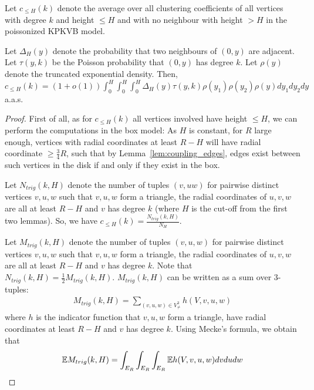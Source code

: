 \begin{lemma}
Let $c_{\leq H}(k)$ denote the average over all clustering coefficients of all vertices with degree $k$ and height $\leq H$ and with no neighbour with height $>H$ in the poissonized KPKVB model.

Let $\Delta_H(y)$ denote the probability that two neighbours of $(0,y)$ are adjacent. Let $\tau(y,k)$ be the Poisson probability that $(0,y)$ has degree $k$. Let $\rho(y)$ denote the truncated exponential density.
Then,
$c_{\leq H}(k) = (1+o(1))\int_0^H \int_0^H \int_0^H \Delta_H(y) \tau(y,k)\rho(y_1)\rho(y_2)\rho(y) dy_1dy_2 dy$ a.a.s.
\end{lemma}
\begin{proof}
First of all, as for $c_{\leq H}(k)$ all vertices involved have height $\leq H$, we can perform the computations in the box model: As $H$ is constant, for $R$ large enough, vertices with radial coordinates at least $R-H$ will have radial coordinate $\geq \frac{3}{4}R$, such that by Lemma~\ref{lem:coupling_edges}, edges exist between such vertices in the disk if and only if they exist in the box.

Let $N_{trig}(k,H)$ denote the number of tuples $(v,uw)$ for pairwise distinct vertices $v,u,w$ such that $v,u,w$ form a triangle, the radial coordinates of $u,v,w$ are all at least $R-H$ and $v$ has degree $k$ (where $H$ is the cut-off from the first two lemmas). So, we have $c_{\leq H}(k) = \frac{N_{trig}(k,H)}{N_H}$.

Let $M_{trig}(k,H)$ denote the number of tuples $(v,u,w)$ for pairwise distinct vertices $v,u,w$ such that $v,u,w$ form a triangle, the radial coordinates of $u,v,w$ are all at least $R-H$ and $v$ has degree $k$. Note that $N_{trig}(k,H) = \frac{1}{2}M_{trig}(k,H)$. $M_{trig}(k,H)$ can be written as a sum over $3$-tuples:
\begin{align*}
M_{trig}(k,H) = \sum_{(v,u,w) \in V_{\not =}^3} h(V,v,u,w)
\end{align*}
where $h$ is the indicator function that $v,u,w$ form a triangle, have radial coordinates at least $R-H$ and $v$ has degree $k$.
Using Mecke's formula, we obtain that 
\begin{align*}
\mathbb{E} M_{trig}(k,H) = \int_{E_R} \int_{E_R}\int_{E_R} \mathbb{E} h(V,v,u,w) dvdudw
\end{align*}




\end{proof}
